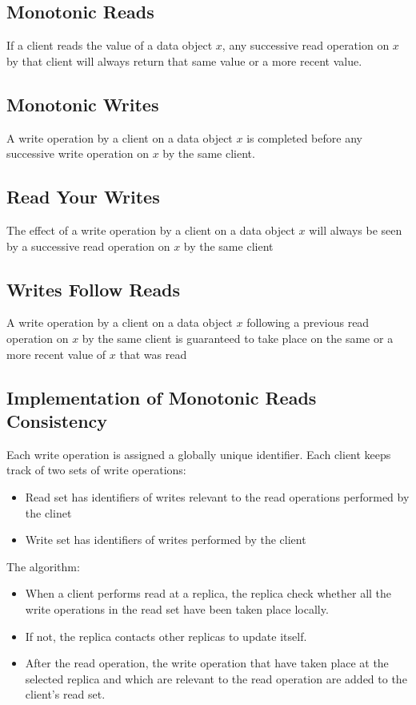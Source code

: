 \begin{multicols*}{2}
\subsection{Monotonic Reads}

\noindent If a client reads the value of a data object $x$, any successive read operation on $x$ by that client will always return that same value or a more recent value.

\subsection{Monotonic Writes}

\noindent A write operation by a client on a data object $x$ is completed before any successive write operation on $x$ by the same client. 

\subsection{Read Your Writes}

\noindent The effect of a write operation by a client on a data object $x$ will always be seen by a successive read operation on $x$ by the same client

\subsection{Writes Follow Reads}

\noindent A write operation by a client on a data object $x$ following a previous read operation on $x$ by the same client is guaranteed to take place on the same or a more recent value of $x$ that was read

\subsection{Implementation of Monotonic Reads Consistency}

\noindent Each write operation is assigned a globally unique identifier. Each client keeps track of two sets of write operations:
\begin{itemize}
  \item Read set has identifiers of writes relevant to the read operations performed by the clinet
  \item Write set has identifiers of writes performed by the client
\end{itemize}

\noindent The algorithm:
\begin{itemize}
  \item When a client performs read at a replica, the replica check whether all the write operations in the read set have been taken place locally.
  \item If not, the replica contacts other replicas to update itself.
  \item After the read operation, the write operation that have taken place at the selected replica and which are relevant to the read operation are added to the client's read set.
\end{itemize}

\end{multicols*}
